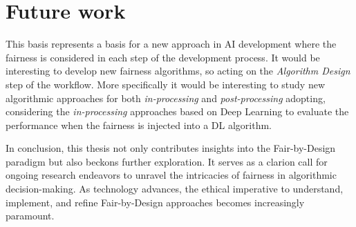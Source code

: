 \section{Future work}

This basis represents a basis for a new approach in AI development where the fairness is considered in each step of the development process. It would be interesting to develop new fairness algorithms, so acting on the \emph{Algorithm Design} step of the workflow. More specifically it would be interesting to study new algorithmic approaches for both \emph{in-processing} and \emph{post-processing} adopting, considering the \emph{in-processing} approaches based on Deep Learning to evaluate the performance when the fairness is injected into a DL algorithm.

In conclusion, this thesis not only contributes insights into the Fair-by-Design paradigm but also beckons further exploration. It serves as a clarion call for ongoing research endeavors to unravel the intricacies of fairness in algorithmic decision-making. As technology advances, the ethical imperative to understand, implement, and refine Fair-by-Design approaches becomes increasingly paramount.

